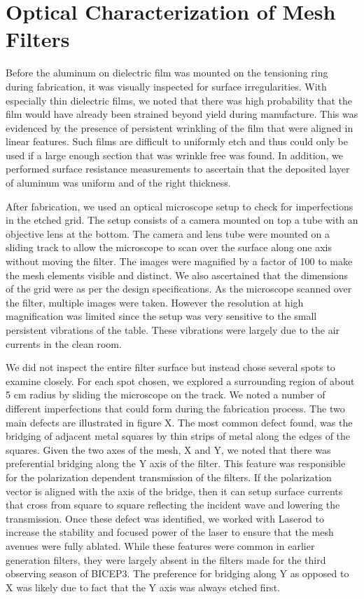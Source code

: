 \documentclass[12pt]{article}
\begin{document}
\section{Optical Characterization of Mesh Filters}
Before the aluminum on dielectric film was mounted on the tensioning ring during fabrication, it was visually inspected for surface irregularities. With especially thin dielectric films, we noted that there was high probability that the film would have already been strained beyond yield during manufacture. This was evidenced by the presence of persistent wrinkling of the film that were aligned in linear features. Such films are difficult to uniformly etch and thus could only be used if a large enough section that was wrinkle free was found. In addition, we performed surface resistance measurements to ascertain that the deposited layer of aluminum was uniform and of the right thickness. 

After fabrication, we used an optical microscope setup to check for imperfections in the etched grid. The setup consists of a camera mounted on top a tube with an objective lens at the bottom. The camera and lens tube were mounted on a sliding track to allow the microscope to scan over the surface along one axis without moving the filter. The images were magnified by a factor of 100 to make the mesh elements visible and distinct. We also ascertained that the dimensions of the grid were as per the design specifications. As the microscope scanned over the filter, multiple images were taken. However the resolution at high magnification was limited since the setup was very sensitive to the small persistent vibrations of the table. These vibrations were largely due to the air currents in the clean room.

We did not inspect the entire filter surface but instead chose several spots to examine closely. For each spot chosen, we explored a surrounding region of about 5 cm radius by sliding the microscope on the track. We noted a number of different imperfections that could form during the fabrication process. The two main defects are illustrated in figure X. The most common defect found, was the bridging of adjacent metal squares by thin strips of metal along the edges of the squares. Given the two axes of the mesh, X and Y, we noted that there was preferential bridging along the Y axis of the filter. This feature was responsible for the polarization dependent transmission of the filters. If the polarization vector is aligned with the axis of the bridge, then it can setup surface currents that cross from square to square reflecting the incident wave and lowering the transmission. Once these defect was identified, we worked with Laserod to increase the stability and focused power of the laser to ensure that the mesh avenues were fully ablated. While these features were common in earlier generation filters, they were largely absent in the filters made for the third observing season of BICEP3. The preference for bridging along Y as opposed to X was likely due to fact that the Y axis was always etched first.
\end{document}
